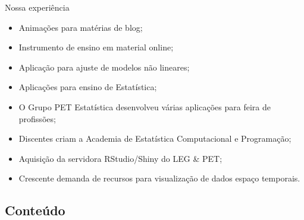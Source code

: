 \begin{frame}
  Nossa experiência
  \begin{multicols}{2}
    \begin{itemize}
    \item Animações para matérias de blog;
    \item Instrumento de ensino em material online;
    \item Aplicação para ajuste de modelos não lineares;
    \item Aplicações para ensino de Estatística;
    \end{itemize}
    \vfill \columnbreak
    \begin{itemize}
    \item O Grupo PET Estatística desenvolveu várias aplicações para
      feira de profissões;
    \item Discentes criam a Academia de Estatística Computacional e
      Programação;
    \item Aquisição da servidora RStudio/Shiny do LEG \& PET;
    \item Crescente demanda de recursos para visualização de dados
      espaço temporais.
    \end{itemize}
  \end{multicols}
\end{frame}

\subsection{Conteúdo}

